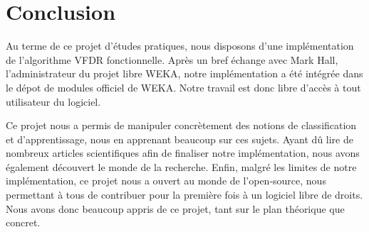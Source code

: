 \section{Conclusion} 
        
       Au terme de ce projet d'études pratiques, nous disposons d'une implémentation de l'algorithme VFDR fonctionnelle. Après un bref échange avec Mark Hall, l'administrateur du projet libre WEKA, notre implémentation a été intégrée dans le dépot de modules officiel de WEKA. Notre travail est donc libre d'accès à tout utilisateur du logiciel. 

	   Ce projet nous a permis de manipuler concrètement des notions de classification et d'apprentissage, nous en apprenant beaucoup sur ces sujets. Ayant dû lire de nombreux articles scientifiques afin de finaliser notre implémentation, nous avons également découvert le monde de la recherche. Enfin, malgré les limites de notre implémentation, ce projet nous a ouvert au monde de l'open-source, nous permettant à tous de contribuer pour la première fois à un logiciel libre de droits. Nous avons donc beaucoup appris de ce projet, tant sur le plan théorique que concret.